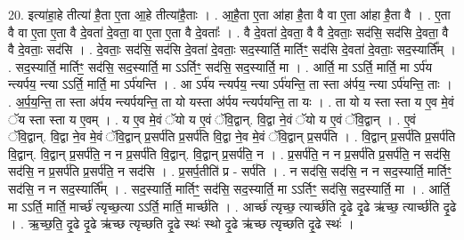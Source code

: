 \documentclass[17pt]{extarticle}
\begin{document}
20. इत्या॑हा॒हे तीत्या॑ है॒ता ए॒ता आ॒हे तीत्या॑है॒ताः । . आ॒है॒ता ए॒ता आ॑हा है॒ता वै वा ए॒ता आ॑हा है॒ता वै । . ए॒ता वै वा ए॒ता ए॒ता वै दे॒वता॑ दे॒वता॒ वा ए॒ता ए॒ता वै दे॒वताः᳚ । . वै दे॒वता॑ दे॒वता॒ वै वै दे॒वताः॒ सद॑सि॒ सद॑सि दे॒वता॒ वै वै दे॒वताः॒ सद॑सि । . दे॒वताः॒ सद॑सि॒ सद॑सि दे॒वता॑ दे॒वताः॒ सद॒स्यार्ति॒ मार्तिꣳ॒॒ सद॑सि दे॒वता॑ दे॒वताः॒ सद॒स्यार्ति᳚म् । . सद॒स्यार्ति॒ मार्तिꣳ॒॒ सद॑सि॒ सद॒स्यार्ति॒ मा ऽऽर्तिꣳ॒॒ सद॑सि॒ सद॒स्यार्ति॒ मा । . आर्ति॒ मा ऽऽर्ति॒ मार्ति॒ मा ऽर्प॑य न्त्यर्पय॒ न्त्या ऽऽर्ति॒ मार्ति॒ मा ऽर्प॑यन्ति । . आ ऽर्प॑य न्त्यर्पय॒ न्त्या ऽर्प॑यन्ति॒ ता स्ता अ॑र्पय॒ न्त्या ऽर्प॑यन्ति॒ ताः । . अ॒र्प॒य॒न्ति॒ ता स्ता अ॑र्पय न्त्यर्पयन्ति॒ ता यो यस्ता अ॑र्पय न्त्यर्पयन्ति॒ ता यः । . ता यो य स्ता स्ता य ए॒व मे॒वं ॅय स्ता स्ता य ए॒वम् । . य ए॒व मे॒वं ॅयो य ए॒वं ॅवि॒द्वान्. वि॒द्वा ने॒वं ॅयो य ए॒वं ॅवि॒द्वान् । . ए॒वं ॅवि॒द्वान्. वि॒द्वा ने॒व मे॒वं ॅवि॒द्वान् प्र॒सर्प॑ति प्र॒सर्प॑ति वि॒द्वा ने॒व मे॒वं ॅवि॒द्वान् प्र॒सर्प॑ति । . वि॒द्वान् प्र॒सर्प॑ति प्र॒सर्प॑ति वि॒द्वान्. वि॒द्वान् प्र॒सर्प॑ति॒ न न प्र॒सर्प॑ति वि॒द्वान्. वि॒द्वान् प्र॒सर्प॑ति॒ न । . प्र॒सर्प॑ति॒ न न प्र॒सर्प॑ति प्र॒सर्प॑ति॒ न सद॑सि॒ सद॑सि॒ न प्र॒सर्प॑ति प्र॒सर्प॑ति॒ न सद॑सि । . प्र॒सर्प॒तीति॑ प्र - सर्प॑ति । . न सद॑सि॒ सद॑सि॒ न न सद॒स्यार्ति॒ मार्तिꣳ॒॒ सद॑सि॒ न न सद॒स्यार्ति᳚म् । . सद॒स्यार्ति॒ मार्तिꣳ॒॒ सद॑सि॒ सद॒स्यार्ति॒ मा ऽऽर्तिꣳ॒॒ सद॑सि॒ सद॒स्यार्ति॒ मा । . आर्ति॒ मा ऽऽर्ति॒ मार्ति॒ मार्च्छ॑ त्यृच्छ॒त्या ऽऽर्ति॒ मार्ति॒ मार्च्छ॑ति । . आर्च्छ॑ त्यृच्छ॒ त्यार्च्छ॑ति दृ॒ढे दृ॒ढे ऋ॑च्छ॒ त्यार्च्छ॑ति दृ॒ढे । . ऋ॒च्छ॒ति॒ दृ॒ढे दृ॒ढे ऋ॑च्छ त्यृच्छति दृ॒ढे स्थः॑ स्थो दृ॒ढे ऋ॑च्छ त्यृच्छति दृ॒ढे स्थः॑ । \newline
\end{document}
